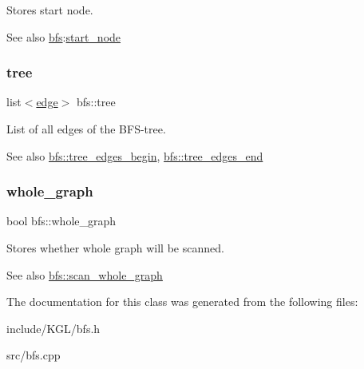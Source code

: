 Stores start node. 

\begin{DoxySeeAlso}{See also}
\mbox{\hyperlink{classbfs}{bfs}}\+:\mbox{\hyperlink{classbfs_aecb495d5cc06f8a0f89239d70668abba}{start\+\_\+node}} 
\end{DoxySeeAlso}
\mbox{\label{classbfs_aa259f09ada9928cda41bcb540f685e80}} 
\subsubsection{\texorpdfstring{tree}{tree}}
{\footnotesize\ttfamily list$<$\mbox{\hyperlink{classedge}{edge}}$>$ bfs\+::tree\hspace{0.3cm}{\ttfamily [protected]}}



List of all edges of the B\+F\+S-\/tree. 

\begin{DoxySeeAlso}{See also}
\mbox{\hyperlink{classbfs_aef8c6f063e1d1e52770f5adf12c7cb28}{bfs\+::tree\+\_\+edges\+\_\+begin}}, \mbox{\hyperlink{classbfs_a55e57b15957b08f3334568eeefb4223a}{bfs\+::tree\+\_\+edges\+\_\+end}} 
\end{DoxySeeAlso}
\mbox{\label{classbfs_a6c08fbcc90d71f1cbdd03a1cdaa9dc99}} 
\subsubsection{\texorpdfstring{whole\+\_\+graph}{whole\_graph}}
{\footnotesize\ttfamily bool bfs\+::whole\+\_\+graph\hspace{0.3cm}{\ttfamily [protected]}}



Stores whether whole graph will be scanned. 

\begin{DoxySeeAlso}{See also}
\mbox{\hyperlink{classbfs_ac58d930764e6aa859fe706b1d916b9ad}{bfs\+::scan\+\_\+whole\+\_\+graph}} 
\end{DoxySeeAlso}


The documentation for this class was generated from the following files\+:\begin{DoxyCompactItemize}
\item 
include/\+K\+G\+L/bfs.\+h\item 
src/bfs.\+cpp\end{DoxyCompactItemize}
